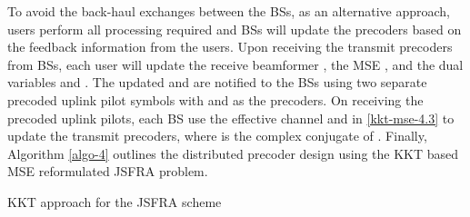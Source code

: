 To avoid the back-haul exchanges between the \acp{BS}, as an alternative approach, users perform all processing required and \acp{BS} will update the precoders based on the feedback information from the users. Upon receiving the transmit precoders from \acp{BS}, each user will update the receive beamformer , the \ac{MSE} , and the dual variables  and . The updated  and  are notified to the \acp{BS} using two separate precoded uplink pilot symbols with  and  as the precoders. On receiving the precoded uplink pilots, each \ac{BS} use the effective channel  and  in \eqref{kkt-mse-4.3} to update the transmit precoders, where  is the complex conjugate of . Finally, Algorithm \ref{algo-4} outlines the distributed precoder design using the \ac{KKT} based \ac{MSE} reformulated \ac{JSFRA} problem.
\begin{algorithm}
 \SetAlgoLined
 \DontPrintSemicolon
 \BlankLine
 \caption{\ac{KKT} approach for the \ac{JSFRA} scheme}
 \label{algo-4}
\end{algorithm}

